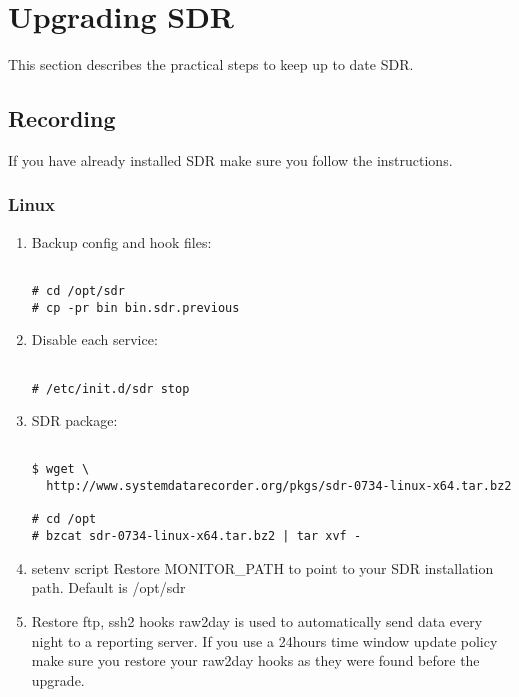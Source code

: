 
\pagebreak
\section{Upgrading SDR}
\noindent
This section describes the practical steps to keep up to
date SDR.

\subsection*{Recording}
\noindent
If you have already installed SDR make sure you follow 
the instructions.


\subsubsection*{Linux}

\begin{enumerate}

\item Backup config and hook files:
\begin{Verbatim}[fontsize=\relsize{-2},frame=single,
                 label=\fbox{SDR Upgrading procedure},
                 framesep=3mm,labelposition=bottomline]

# cd /opt/sdr
# cp -pr bin bin.sdr.previous

\end{Verbatim}


\item Disable each service:
\begin{Verbatim}[fontsize=\relsize{-2},frame=single,
                 label=\fbox{Disable Services},
                 framesep=3mm,labelposition=bottomline]

# /etc/init.d/sdr stop 

\end{Verbatim}


\item SDR package:

\begin{Verbatim}[fontsize=\relsize{-2},frame=single,
                 label=\fbox{Installation Package},
                 framesep=3mm,labelposition=bottomline]

$ wget \
  http://www.systemdatarecorder.org/pkgs/sdr-0734-linux-x64.tar.bz2

# cd /opt
# bzcat sdr-0734-linux-x64.tar.bz2 | tar xvf -

\end{Verbatim}

\item setenv script
\noindent
Restore MONITOR\_PATH to point to your SDR installation
path. Default is /opt/sdr

\item Restore ftp, ssh2 hooks
\noindent
raw2day is used to automatically send data every night 
to a reporting server. If you use a 24hours time window 
update policy make sure you restore your raw2day hooks 
as they were found before the upgrade.

\end{enumerate}



